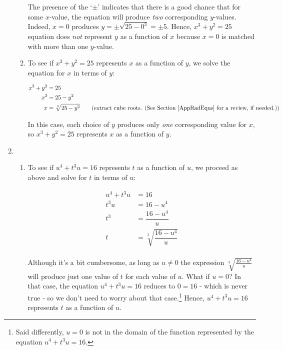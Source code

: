 \begin{ex}
\begin{enumerate}
\begin{enumerate}
The presence of the `$\pm$' indicates that there is a good chance that for some $x$-value, the equation will produce \textit{two} corresponding $y$-values.  Indeed, $x = 0$ produces $y = \pm \sqrt{25 - 0^{3}} = \pm 5$.  Hence, $x^{3} + y^{2} = 25$ equation does \textit{not} represent $y$ as a function of $x$ because $x = 0$ is matched with more than one $y$-value.

\item  To see if $x^{3} + y^{2} = 25$ represents $x$ as a function of $y$, we solve the equation for $x$ in terms of $y$:

\begin{align*}
x^{3} + y^{2}  & = 25 \\
x^{3} & = 25 - y^{2} \\
x & = \sqrt[3]{25 - y^{2}} \tag{extract cube roots. (See Section \ref{AppRadEqus} for a review, if needed.)} \\
\end{align*}

In this case, each choice of $y$ produces only \textit{one} corresponding value for $x$, so   $x^{3} + y^{2} = 25$ represents $x$ as a function of $y$.

\end{enumerate}

\item

\begin{enumerate}

\item  To see if  $u^{4} + t^{3}u = 16$ represents $t$ as a function of $u$, we proceed as above and solve for $t$ in terms of $u$:

\begin{align*}
u^{4} + t^{3} u  & = 16 \\
t^{3} u & = 16 - u^{4} \\
t^{3} & = \dfrac{16 - u^{4}}{u} \tag{assumes $u \neq 0$} \\
t & = \sqrt[3]{\dfrac{16 - u^{4}}{u}} \tag{extract cube roots.} \\
\end{align*}

Although it's a bit cumbersome, as long as $u \neq 0$ the expression  $\sqrt[3]{\frac{16-u^4}{u}}$ will produce just one value of $t$ for each value of $u$.  What if $u = 0$? In that case, the equation $u^{4} + t^{3}u = 16$ reduces to $0 = 16$ - which is never true - so we don't need to worry about that case.\footnote{Said differently, $u = 0$ is not in the domain of the function represented by the equation $u^{4} + t^{3}u = 16$.}  Hence, $u^{4} + t^{3}u = 16$ represents $t$ as a function of $u$.


\end{enumerate}
\end{enumerate}
\end{ex}
